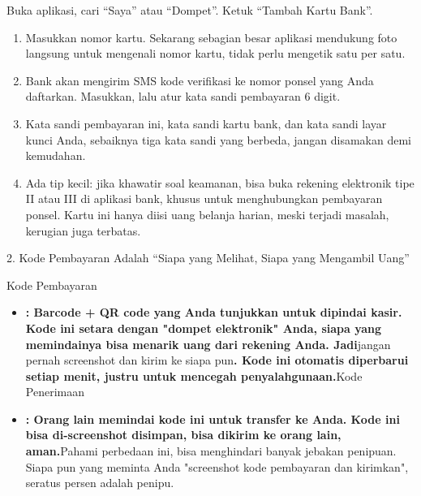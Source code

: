 


Buka aplikasi, cari “Saya” atau “Dompet”. Ketuk “Tambah Kartu Bank”.

\begin{enumerate}
  \item Masukkan nomor kartu. Sekarang sebagian besar aplikasi mendukung foto langsung untuk mengenali nomor kartu, tidak perlu mengetik satu per satu.
  \item Bank akan mengirim SMS kode verifikasi ke nomor ponsel yang Anda daftarkan. Masukkan, lalu atur kata sandi pembayaran 6 digit.
  \item Kata sandi pembayaran ini, kata sandi kartu bank, dan kata sandi layar kunci Anda, sebaiknya tiga kata sandi yang berbeda, jangan disamakan demi kemudahan.
  \item Ada tip kecil: jika khawatir soal keamanan, bisa buka rekening elektronik tipe II atau III di aplikasi bank, khusus untuk menghubungkan pembayaran ponsel. Kartu ini hanya diisi uang belanja harian, meski terjadi masalah, kerugian juga terbatas.
\end{enumerate}

2. Kode Pembayaran Adalah “Siapa yang Melihat, Siapa yang Mengambil Uang”


Kode Pembayaran

\begin{itemize}
  \item \textbf{: Barcode + QR code yang Anda tunjukkan untuk dipindai kasir. Kode ini setara dengan "dompet elektronik" Anda, siapa yang memindainya bisa menarik uang dari rekening Anda. Jadi}jangan pernah screenshot dan kirim ke siapa pun\textbf{. Kode ini otomatis diperbarui setiap menit, justru untuk mencegah penyalahgunaan.}Kode Penerimaan
  \item \textbf{: Orang lain memindai kode ini untuk transfer ke Anda. Kode ini bisa di-screenshot disimpan, bisa dikirim ke orang lain, aman.}Pahami perbedaan ini, bisa menghindari banyak jebakan penipuan. Siapa pun yang meminta Anda "screenshot kode pembayaran dan kirimkan", seratus persen adalah penipu.
\end{itemize}

